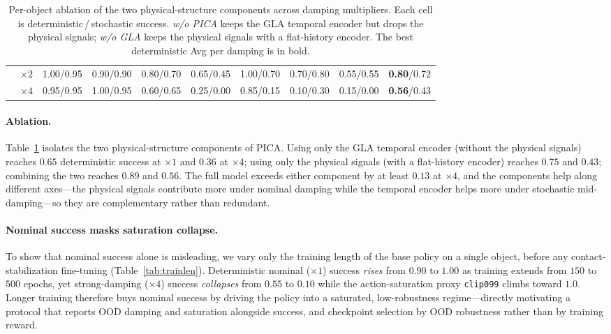 \documentclass{llmxive}
\begin{document}
\begin{table}[t]
{\begin{tabular}{llcccccccc}
 & $\times2$ & 1.00/0.95 & 0.90/0.90 & 0.80/0.70 & 0.65/0.45 & 1.00/0.70 & 0.70/0.80 & 0.55/0.55 & \textbf{0.80}/0.72 \\
 & $\times4$ & 0.95/0.95 & 1.00/0.95 & 0.60/0.65 & 0.25/0.00 & 0.85/0.15 & 0.10/0.30 & 0.15/0.00 & \textbf{0.56}/0.43 \\
\bottomrule
\end{tabular}}
\caption{Per-object ablation of the two physical-structure components across damping multipliers. Each cell is deterministic\,/\,stochastic success. \emph{w/o PICA} keeps the GLA temporal encoder but drops the physical signals; \emph{w/o GLA} keeps the physical signals with a flat-history encoder. The best deterministic Avg per damping is in bold.}
\label{tab:ablation}
\end{table}



\paragraph{Ablation.}
Table~\ref{tab:ablation} isolates the two physical-structure
components of PICA. Using only the GLA temporal encoder (without the
physical signals) reaches $0.65$ deterministic success at $\times1$
and $0.36$ at $\times4$; using only the physical signals (with a
flat-history encoder) reaches $0.75$ and $0.43$; combining the two
reaches $0.89$ and $0.56$. The full model exceeds either component by
at least $0.13$ at $\times4$, and the components help along different
axes---the physical signals contribute more under nominal damping
while the temporal encoder helps more under stochastic
mid-damping---so they are complementary rather than redundant.

\paragraph{Nominal success masks saturation collapse.}
To show that nominal success alone is misleading, we vary only the
training length of the base policy on a single object, before any
contact-stabilization fine-tuning (Table~\ref{tab:trainlen}).
Deterministic nominal ($\times1$) success \emph{rises} from $0.90$ to
$1.00$ as training extends from $150$ to $500$ epochs, yet
strong-damping ($\times4$) success \emph{collapses} from $0.55$ to
$0.10$ while the action-saturation proxy \texttt{clip099} climbs toward
$1.0$. Longer training therefore buys nominal success by driving the
policy into a saturated, low-robustness regime---directly motivating a
protocol that reports OOD damping and saturation alongside success, and
checkpoint selection by OOD robustness rather than by training reward.
\end{document}
